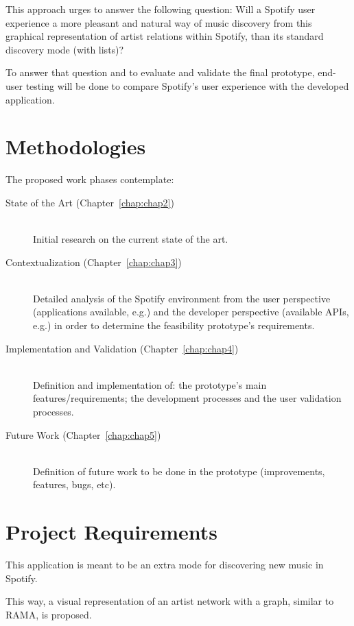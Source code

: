   This approach urges to answer the following question: Will a Spotify user experience a more pleasant and natural way of music discovery from this graphical representation of artist relations within Spotify, than its standard discovery mode (with lists)?

  To answer that question and to evaluate and validate the final prototype, end-user testing will be done to compare Spotify's user experience with the developed application.

\section{Methodologies} %
\label{sec:methodologies}
  
  The proposed work phases contemplate:

  \begin{description}
    \item[State of the Art (Chapter~\ref{chap:chap2})] \hfill \\
      Initial research on the current state of the art.
    \item[Contextualization (Chapter~\ref{chap:chap3})] \hfill \\
      Detailed analysis of the Spotify environment from the user perspective (applications available, e.g.) and the developer perspective (available APIs, e.g.) in order to determine the feasibility  prototype's requirements.
    \item[Implementation and Validation (Chapter~\ref{chap:chap4})] \hfill \\
      Definition and implementation of: the prototype's main features/requirements; the development processes and the user validation processes.
    \item[Future Work (Chapter~\ref{chap:chap5})] \hfill \\
      Definition of future work to be done in the prototype (improvements, features, bugs, etc).
  \end{description}


\section{Project Requirements}
\label{sec:proj}

  This application is meant to be an extra mode for discovering new music in Spotify.

  This way, a visual representation of an artist network with a graph, similar to RAMA, is proposed.


